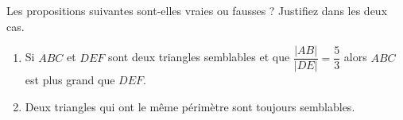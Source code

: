 %
%
    Les propositions suivantes sont-elles vraies ou fausses ? Justifiez dans les deux cas.
    \begin{enumerate}
        \item Si $ABC$ et $DEF$ sont deux triangles semblables et que $\dfrac{|AB|}{|DE|}=\dfrac{5}{3}$ alors $ABC$ est plus grand que $DEF$.
        \item Deux triangles qui ont le même périmètre sont toujours semblables.
    \end{enumerate}
